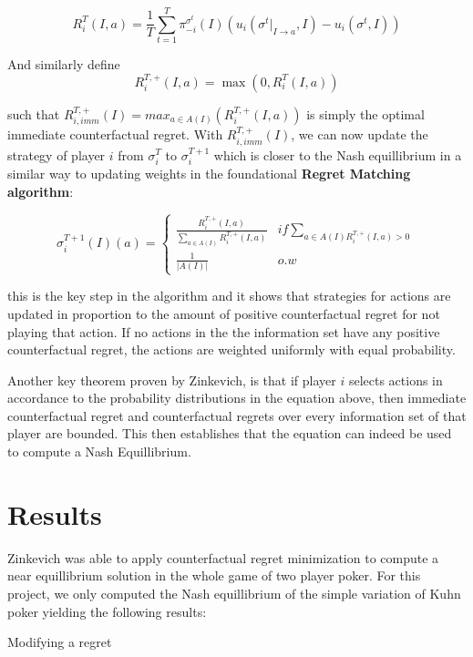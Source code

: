 \documentclass{article}
\begin{document}
\[ 
R^T_i(I,a) = \frac{1}{T} \sum_{t=1}^T \pi_{-i}^{\sigma^t}(I)(u_i(\sigma^t|_{I \rightarrow a}, I) - u_i(\sigma^t, I)) 
\]

And similarly define 
\[ R_{i}^{T,+}(I, a) = \max(0, R_{i}^T(I,a)) \]


such that $R^{T,+}_{i,imm}(I) = max_{a \in A(I)}(R^{T,+}_i(I,a))$ is simply the optimal immediate counterfactual regret. With $R^{T,+}_{i,imm}(I)$, we can now update the strategy of player $i$  from $\sigma^T_i$ to $\sigma^{T+1}_i$ which is closer to the Nash equillibrium in a similar way to updating weights in the foundational \textbf{Regret Matching algorithm}:

\[ 
\sigma_i^{T+1}(I)(a) = 
\begin{cases} 
      \frac{R_i^{T,+}(I,a)}{\sum_{a \in A(I)} R_i^{T,+}(I,a)} & if \sum_{a \in A(I) R_i^{T,+}(I,a) > 0} \\
      \frac{1}{|A(I)|} & o.w 
   \end{cases}
\]

this is the key step in the algorithm and it shows that strategies for actions are updated in proportion to the amount of positive counterfactual regret for not playing that action. If no actions in the the information set have any positive counterfactual regret, the actions are weighted uniformly with equal probability.

Another key theorem proven by Zinkevich, is that if player $i$ selects actions in accordance to the probability distributions in the equation above, then immediate counterfactual regret and counterfactual regrets over every information set of that player are bounded. This then establishes that the equation can indeed be used to compute a Nash Equillibrium. 


\section{Results}
Zinkevich was able to apply counterfactual regret minimization to compute a near equillibrium solution in the whole game of two player poker. For this project, we only computed the Nash equillibrium of the simple variation of Kuhn poker yielding the following results:



Modifying a regret
\end{document}
